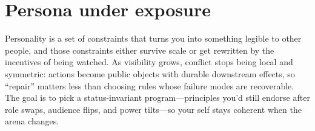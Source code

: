 \part{Persona under exposure}
\epigraph{Personality is a set of constraints that turns you into something legible to other people, and those constraints either survive scale or get rewritten by the incentives of being watched. As visibility grows, conflict stops being local and symmetric: actions become public objects with durable downstream effects, so ``repair'' matters less than choosing rules whose failure modes are recoverable. The goal is to pick a status-invariant program---principles you'd still endorse after role swaps, audience flips, and power tilts---so your self stays coherent when the arena changes.}{}
\clearpage
